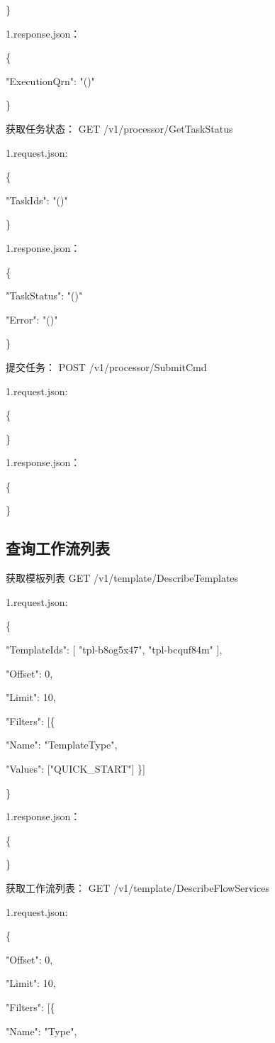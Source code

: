 \}


1.response.json：

\{

"ExecutionQrn": "\@notEmpty()"

\}


获取任务状态：
GET /v1/processor/GetTaskStatus

1.request.json:

\{

"TaskIds": "\@exists()"

\}


1.response.json：

\{

"TaskStatus": "\@exists()"

"Error": "\@notExists()"

\}

提交任务：
POST /v1/processor/SubmitCmd

1.request.json:

\{

\}

1.response.json：

\{

\}

\subsection{查询工作流列表}
获取模板列表
GET /v1/template/DescribeTemplates

1.request.json:

\{

"TemplateIds": [
"tpl-b8og5x47",
"tpl-bcquf84m"
],

"Offset": 0,

"Limit": 10,

"Filters": [\{

    "Name": "TemplateType",

    "Values": ["QUICK\_START"]
\}]

\}


1.response.json：

\{

\}

获取工作流列表：
GET /v1/template/DescribeFlowServices

1.request.json:

\{

"Offset": 0,

"Limit": 10,

"Filters": [\{

"Name": "Type",

